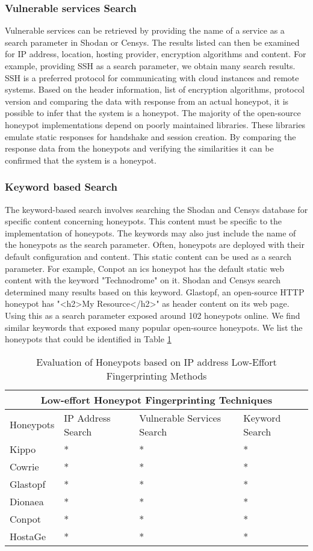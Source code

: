 \subsubsection{Vulnerable services Search}
 Vulnerable services can be retrieved by providing the name of a service as a search parameter in Shodan or Censys. The results listed can then be examined for IP address, location, hosting provider, encryption algorithms and content. For example, providing SSH as a search parameter, we obtain many search results. SSH is a preferred protocol for communicating with cloud instances and remote systems. Based on the header information, list of encryption algorithms, protocol version and comparing the data with response from an actual honeypot, it is possible to infer that the system is a honeypot. The majority of the open-source honeypot implementations depend on poorly maintained libraries. These libraries emulate static responses for handshake and session creation. By comparing the response data from the honeypots and verifying the similarities it can be confirmed that the system is a honeypot. 
 
 \subsubsection{Keyword based Search}
The keyword-based search involves searching the Shodan and Censys database for specific content concerning honeypots. This content must be specific to the implementation of honeypots. The keywords may also just include the name of the honeypots as the search parameter. Often, honeypots are deployed with their default configuration and content. This static content can be used as a search parameter. For example, Conpot an \acrshort{ics} honeypot has the default static web content with the keyword "Technodrome" on it. Shodan and Censys search determined many results based on this keyword. Glastopf, an open-source HTTP honeypot has "<h2>My Resource</h2>" as header content on its web page. Using this as a search parameter exposed around 102 honeypots online. We find similar keywords that exposed many popular open-source honeypots. We list the honeypots that could be identified in Table \ref{Tab:IP address}

 \begin{table}[]
 \begin{tabular}{ |p{1.5cm}||p{1.5cm}||p{1.2cm}|p{1.4cm}| }
 \hline
 \multicolumn{4}{|c|}{Low-effort Honeypot Fingerprinting Techniques} \\
 \hline
 Honeypots & IP Address Search & Vulnerable Services Search & Keyword Search \\
 \hline
 Kippo   & *  &* & *  \\
 Cowrie  & *  &* & *  \\
 Glastopf& *  &* & *  \\
 Dionaea & *  &* & *  \\
 Conpot  & *  &* & *  \\
 HostaGe & *  &*  &  *  \\
 \hline
\end{tabular}
 \caption{Evaluation of Honeypots based on IP address Low-Effort Fingerprinting Methods}
 \label{Tab:IP address}
 \end{table}


